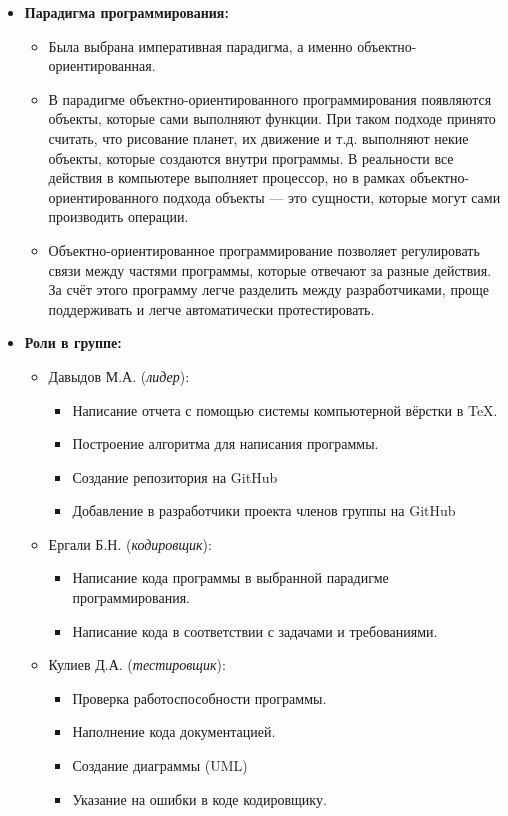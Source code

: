 \documentclass[14pt, oneside]{altsu-report}
\begin{document}
\begin{itemize}
    \item \textbf{Парадигма программирования:}
        \begin{itemize}
            \item Была выбрана императивная парадигма, а именно объектно-ориентированная.
            \item В парадигме объектно-ориентированного программирования появляются объекты, которые сами выполняют функции. При таком подходе принято считать, что рисование планет, их движение и т.д. выполняют некие объекты, которые создаются внутри программы. В реальности все действия в компьютере выполняет процессор, но в рамках объектно-ориентированного подхода объекты — это сущности, которые могут сами производить операции.
            \item Объектно-ориентированное программирование позволяет регулировать связи между частями программы, которые отвечают за разные действия. За счёт этого программу легче разделить между разработчиками, проще поддерживать и легче автоматически протестировать.
        \end{itemize}
    \item \textbf{Роли в группе:}
    \begin{itemize}
        \item Давыдов М.А. (\textit{лидер}):
            \begin{itemize}
                \item Написание отчета с помощью системы компьютерной вёрстки в \TeX.
                \item Построение алгоритма для написания программы.
                \item Создание репозитория на GitHub
                \item Добавление в разработчики проекта членов группы на GitHub
            \end{itemize}
        \item Ергали Б.Н. (\textit{кодировщик}):
            \begin{itemize}
                \item Написание кода программы в выбранной парадигме программирования.
                \item Написание кода в соответствии с задачами и требованиями.
            \end{itemize}
        \item Кулиев Д.А. (\textit{тестировщик}):
            \begin{itemize}
                \item Проверка работоспособности программы.
                \item Наполнение кода документацией.
                \item Создание диаграммы (UML)
                \item Указание на ошибки в коде кодировщику.
            \end{itemize}
        \end{itemize}
\end{itemize}
\end{document}
